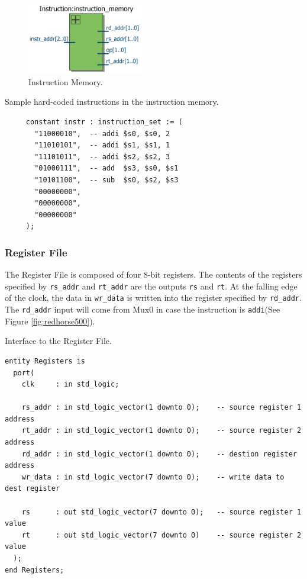 \documentclass[a4paper, 11pt,oneside]{article}
\begin{document}
\begin{figure}[H]
	\begin{center}
	\includegraphics[width=2in]{im.png}
	\caption{Instruction Memory.}
	\label{fig:im} 
	\end{center}
\end{figure}

\begin{listing}[H]
\caption{Sample hard-coded instructions in the instruction memory.}
\label{code:im_code}
\begin{verbatim}
     constant instr : instruction_set := (
       "11000010",  -- addi $s0, $s0, 2
       "11010101",  -- addi $s1, $s1, 1
       "11101011",  -- addi $s2, $s2, 3
       "01000111",  -- add  $s3, $s0, $s1
       "10101100",  -- sub  $s0, $s2, $s3
       "00000000",
       "00000000",
       "00000000"
     );    
\end{verbatim}
\end{listing}


\subsubsection{Register File}
The Register File is composed of four 8-bit registers. The contents of the 
registers specified by \texttt{rs_addr} and 
\texttt{rt_addr} are the outputs \texttt{rs} and 
\texttt{rt}. At the falling edge of the clock, the data in 
\texttt{wr_data} is written into the register 
specified by \texttt{rd_addr}. The \texttt{rd_addr} input 
will come from Mux0 in case the instruction is \texttt{addi}(See 
Figure \ref{fig:redhorse500}).


\begin{listing}[H]
\caption{Interface to the Register File.}
\label{code:rf}
\begin{verbatim}
entity Registers is
  port(
    clk     : in std_logic;

    rs_addr : in std_logic_vector(1 downto 0);    -- source register 1 address
    rt_addr : in std_logic_vector(1 downto 0);    -- source register 2 address
    rd_addr : in std_logic_vector(1 downto 0);    -- destion register address
    wr_data : in std_logic_vector(7 downto 0);    -- write data to dest register

    rs      : out std_logic_vector(7 downto 0);   -- source register 1 value
    rt      : out std_logic_vector(7 downto 0)    -- source register 2 value
  );
end Registers;

\end{verbatim}
\end{listing}
\end{document}
